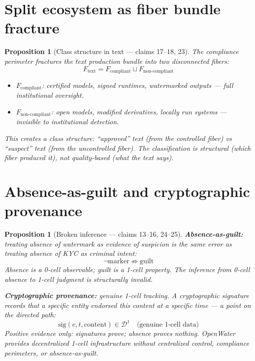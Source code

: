 \documentclass[11pt,a4paper]{article}
\newtheorem{proposition}[definition]{Proposition}
\begin{document}
\section{Split ecosystem as fiber bundle fracture}

\begin{proposition}[Class structure in text --- claims 17--18, 23]
\label{prop:fracture}
The compliance perimeter fractures the text production bundle into two
disconnected fibers:
\[
  F_{\text{text}} = F_{\text{compliant}} \sqcup F_{\text{non-compliant}}
\]
\begin{itemize}
  \item $F_{\text{compliant}}$: certified models, signed runtimes,
    watermarked outputs --- full institutional oversight.
  \item $F_{\text{non-compliant}}$: open models, modified derivatives,
    locally run systems --- invisible to institutional detection.
\end{itemize}
This creates a class structure: ``approved'' text (from the controlled
fiber) vs ``suspect'' text (from the uncontrolled fiber). The
classification is structural (which fiber produced it), not quality-based
(what the text says).
\end{proposition}

\section{Absence-as-guilt and cryptographic provenance}

\begin{proposition}[Broken inference --- claims 13--16, 24--25]
\label{prop:absence}
\textbf{Absence-as-guilt:} treating absence of watermark as evidence of
suspicion is the same error as treating absence of KYC as criminal intent:
\[
  \neg\text{marker} \not\Rightarrow \text{guilt}
\]
Absence is a 0-cell observable; guilt is a 1-cell property. The inference
from 0-cell absence to 1-cell judgment is structurally invalid.

\textbf{Cryptographic provenance:} genuine 1-cell tracking. A
cryptographic signature records that a specific entity endorsed this
content at a specific time --- a point on the directed path:
\[
  \text{sig}(e, t, \text{content}) \in \mathcal{D}^1
  \quad \text{(genuine 1-cell data)}
\]
Positive evidence only: signatures prove; absence proves nothing.
OpenWater provides decentralized 1-cell infrastructure without centralized
control, compliance perimeters, or absence-as-guilt.
\end{proposition}
\end{document}
